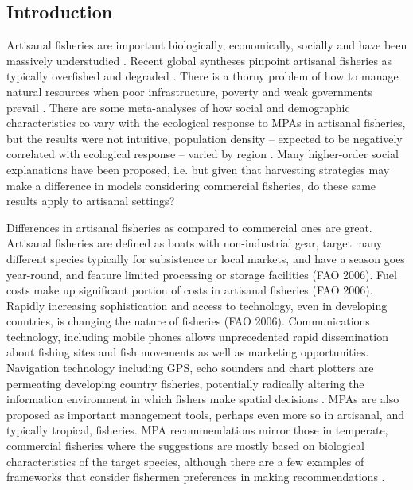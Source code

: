 \documentclass[12pt,a4paper]{report}
\begin{document}
\subsection{Introduction}
Artisanal fisheries are important biologically, economically, socially and have been massively understudied \citep{Wormetal:2009}. Recent global syntheses pinpoint artisanal fisheries as typically overfished and degraded \citep{McCluskeyetal:2008}. There is a thorny problem of how to manage natural resources when poor infrastructure, poverty and weak governments prevail \citep{McCluskeyetal:2008}. There are some meta-analyses of how social and demographic characteristics co vary with the ecological response to MPAs in artisanal fisheries, but the results were not intuitive, population density -- expected to be negatively correlated with ecological response -- varied by region \citep{Pollnacetal:2010, Dawetal:2011}. Many higher-order social explanations have been proposed, i.e. \citep{Pollnacetal:2001, McClanahanetal:2006, Pollnacetal:2000} but given that harvesting strategies may make a difference in models considering commercial fisheries, do these same results apply to artisanal settings? 

Differences in artisanal fisheries as compared to commercial ones are great. Artisanal fisheries are defined as boats with non-industrial gear, target many different species typically for subsistence or local markets, and have a season goes year-round,  and feature limited processing or storage facilities (FAO 2006). Fuel costs make up significant portion of costs in artisanal fisheries (FAO 2006). Rapidly increasing sophistication and access to technology, even in developing countries, is changing the nature of fisheries (FAO 2006). Communications technology, including mobile phones allows unprecedented rapid dissemination about fishing sites and fish movements as well as marketing opportunities. Navigation technology including GPS, echo sounders and chart plotters are permeating developing country fisheries, potentially radically altering the information environment in which fishers make spatial decisions \citep{Dawetal:2010}. MPAs are also proposed as important management tools, perhaps even more so in artisanal, and typically tropical, fisheries. MPA recommendations mirror those in temperate, commercial fisheries where the suggestions are mostly based on biological characteristics of the target species, although there are a few examples of frameworks that consider fishermen preferences in making recommendations \citep{Tehetal:2012}. 
\end{document}
